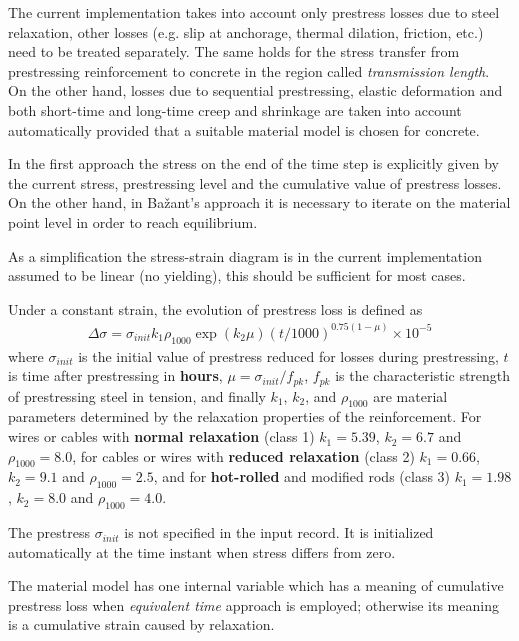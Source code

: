 \documentclass[a4paper]{article}
\begin{document}
The current implementation takes into account only prestress losses
due to steel relaxation, other losses (e.g. slip at anchorage,
thermal dilation, friction, etc.) need to be treated separately. The same holds
for the stress transfer from prestressing reinforcement to concrete in
the region called {\sl{transmission length}}. On the other hand,
losses due to sequential prestressing, elastic deformation and both
short-time and long-time creep and shrinkage are taken into account
automatically provided that a suitable material model is chosen for
concrete. 

In the first approach the stress on the end of the time step is
explicitly given by the current stress, prestressing level and the
cumulative value of prestress losses. On the other hand, in
Ba\v{z}ant's approach it is necessary to iterate on the material point
level in order to reach equilibrium.

As a simplification the stress-strain diagram is in the current
implementation assumed to be
linear (no yielding), this should be sufficient for most cases.

Under a constant strain, the evolution of prestress loss is defined as
\begin{eqnarray}
\Delta \sigma = \sigma_{init} k_1 \rho_{1000} \exp(k_2 \mu)
(t/1000)^{0.75(1-\mu)} \times 10^{-5}
\end{eqnarray}
where 
$\sigma_{init}$ is the initial value of prestress reduced for 
losses during prestressing, $t$ is time after prestressing in
\textbf{hours}, $\mu = \sigma_{init} / f_{pk}$, $f_{pk}$ is the
characteristic strength of prestressing steel in tension, and finally
$k_1$, $k_2$, and $\rho_{1000}$ are material parameters determined by
the relaxation properties of the reinforcement.
For wires or cables with \textbf{normal relaxation} (class 1) $k_1 = 5.39$,
$k_2 = 6.7$ and $\rho_{1000} = 8.0$, for cables or wires with
\textbf{reduced relaxation} (class 2) $k_1 = 0.66$,
$k_2 = 9.1$ and $\rho_{1000} = 2.5$, and for \textbf{hot-rolled}
and modified rods (class 3) $k_1 = 1.98$, $k_2 = 8.0$ and $\rho_{1000}
= 4.0$.

The prestress $\sigma_{init}$ is not specified in the input record. It
is initialized automatically at the time instant when stress differs
from zero.

The material model has one internal variable which has a meaning of
cumulative prestress loss when {\sl{equivalent time}} approach is
employed; otherwise its meaning is a cumulative strain caused by
relaxation.
\end{document}
